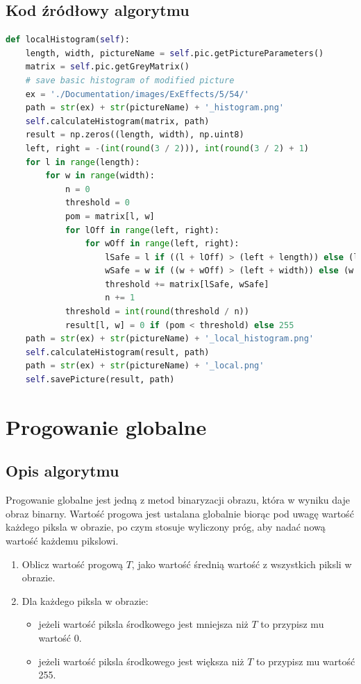 \documentclass[a4paper,12pt, titlepage]{report}
\begin{document}
\subsection*{Kod źródłowy algorytmu}
\begin{lstlisting}[language=Python]
def localHistogram(self):
    length, width, pictureName = self.pic.getPictureParameters()
    matrix = self.pic.getGreyMatrix()
    # save basic histogram of modified picture
    ex = './Documentation/images/ExEffects/5/54/'
    path = str(ex) + str(pictureName) + '_histogram.png'
    self.calculateHistogram(matrix, path)
    result = np.zeros((length, width), np.uint8)
    left, right = -(int(round(3 / 2))), int(round(3 / 2) + 1)
    for l in range(length):
        for w in range(width):
            n = 0
            threshold = 0
            pom = matrix[l, w]
            for lOff in range(left, right):
                for wOff in range(left, right):
                    lSafe = l if ((l + lOff) > (left + length)) else (l + lOff)
                    wSafe = w if ((w + wOff) > (left + width)) else (w + wOff)
                    threshold += matrix[lSafe, wSafe]
                    n += 1
            threshold = int(round(threshold / n))
            result[l, w] = 0 if (pom < threshold) else 255
    path = str(ex) + str(pictureName) + '_local_histogram.png'
    self.calculateHistogram(result, path)
    path = str(ex) + str(pictureName) + '_local.png'
    self.savePicture(result, path)
\end{lstlisting}

\section{Progowanie globalne}
\subsection*{Opis algorytmu}
\par Progowanie globalne jest jedną z metod binaryzacji obrazu, która w wyniku daje obraz binarny. Wartość progowa jest ustalana globalnie biorąc pod uwagę wartość każdego piksla w obrazie, po czym stosuje wyliczony próg, aby nadać nową wartość każdemu pikslowi.
\begin{enumerate}
\item Oblicz wartość progową \(T\), jako wartość średnią wartość z wszystkich piksli w obrazie.
\item Dla każdego piksla w obrazie:
\begin{itemize}
\item jeżeli wartość piksla środkowego jest mniejsza niż \(T\) to przypisz mu wartość 0.
\item jeżeli wartość piksla środkowego jest większa niż \(T\) to przypisz mu wartość 255. 
\end{itemize}
\end{enumerate}
\end{document}
